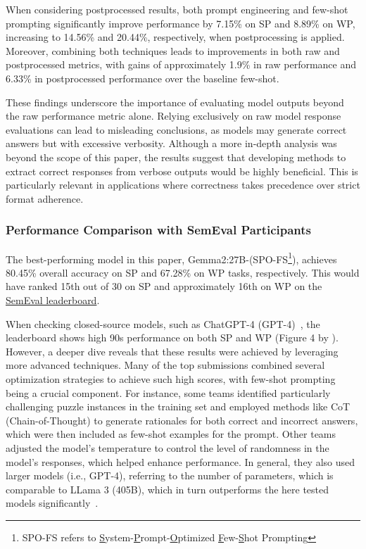 When considering postprocessed results, both prompt engineering and few-shot prompting significantly improve performance by 7.15\% on \ac{SP} and 8.89\% on \ac{WP}, increasing to 14.56\% and 20.44\%, respectively, when postprocessing is applied. Moreover, combining both techniques leads to improvements in both raw and postprocessed metrics, with gains of approximately 1.9\% in raw performance and 6.33\% in postprocessed performance over the baseline few-shot.

These findings underscore the importance of evaluating model outputs beyond the raw performance metric alone. Relying exclusively on raw model response evaluations can lead to misleading conclusions, as models may generate correct answers but with excessive verbosity. Although a more in-depth analysis was beyond the scope of this paper, the results suggest that developing methods to extract correct responses from verbose outputs would be highly beneficial. This is particularly relevant in applications where correctness takes precedence over strict format adherence.

\subsubsection{Performance Comparison with SemEval Participants}

The best-performing model in this paper, Gemma2:27B-(SPO-FS\footnote{SPO-FS refers to \underline{S}ystem-\underline{P}rompt-\underline{O}ptimized \underline{F}ew-\underline{S}hot Prompting}), achieves 80.45\% overall accuracy on \acf{SP} and 67.28\% on \acf{WP} tasks, respectively. This would have ranked 15th out of 30 on \ac{SP} and approximately 16th on \ac{WP} on the \href{https://brainteasersem.github.io/\#leaderboard}{SemEval leaderboard}.

When checking closed-source models, such as ChatGPT-4 (GPT-4)~\cite{openaiGPT4TechnicalReport2024}, the leaderboard shows high 90s performance on both \ac{SP} and \ac{WP} (Figure 4 by \textcite{jiangSemEval2024Task92024}). However, a deeper dive reveals that these results were achieved by leveraging more advanced techniques. Many of the top submissions combined several optimization strategies to achieve such high scores, with few-shot prompting being a crucial component. For instance, some teams identified particularly challenging puzzle instances in the training set and employed methods like \ac{CoT} (Chain-of-Thought) to generate rationales for both correct and incorrect answers, which were then included as few-shot examples for the prompt. Other teams adjusted the model's temperature to control the level of randomness in the model's responses, which helped enhance performance. In general, they also used larger models (i.e., GPT-4), referring to the number of parameters, which is comparable to LLama 3 (405B), which in turn outperforms the here tested models significantly~\cite{grattafioriLlama3Herd2024, openaiGPT4TechnicalReport2024}.

